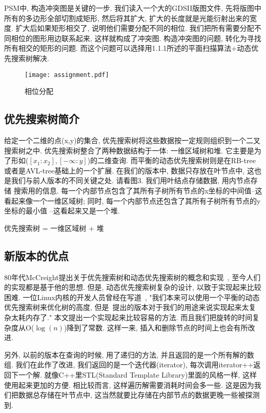\documentclass[a4paper]{article}
\begin{document}
    PSM中, 构造冲突图是关键的一步. 我们读入一个大的GDSII版图文件, 先将版图中所有的多边形全部切割成矩形, 然后将其扩大, 扩大的长度就是光能衍射出来的宽度. 扩大后如果矩形相交了, 说明他们需要分配不同的相位. 我们把所有需要分配不同相位的图形用边联系起来, 这样就构成了冲突图. 构造冲突图的问题, 转化为寻找所有相交的矩形的问题. 而这个问题可以选择用1.1.1所述的平面扫描算法+动态优先搜索树解决. 

\begin{figure}[!h]
  \centering
  \texttt{[image: assignment.pdf]}\\
  \caption{相位分配}\label{fig:assignment}
\end{figure}


\subsection{优先搜索树简介}
给定一个二维的点(x,y)的集合, 优先搜索树将这些数据按一定规则组织到一个二叉搜索树之中. 
优先搜索树整合了两种数据结构于一体: 一维区域树和堆. 
它主要是为了形如($[x_1:x_2],[-\infty:y]$)的二维查询. 而平衡的动态优先搜索树则是在RB-tree或者是AVL-tree基础上的一个扩展. 在我们的版本中, 数据只存放在叶节点中, 
这也是我们与前人版本的不同关键之处. 请看图3. 
我们用叶结点存储数据, 用内节点存储
搜索用的信息. 
每一个内部节点包含了其所有子树所有节点的x坐标的中间值--这看起来像一个一维区域树; 
同时, 每一个内部节点还包含了其所有子树所有节点的y坐标的最小值
--这看起来又是一个堆. 

优先搜索树 = 一维区域树 + 堆



\subsection{新版本的优点}
80年代McCreight提出关于优先搜索树和动态优先搜索树的概念和实现~\cite{Edward_04}, 至今人们的实现都是基于他的思想. 但是, 动态优先搜索树复杂的设计, 
以致于实现起来比较困难. 一位Linux内核的开发人员曾经在写道~\cite{LNX_03},
"我们本来可以使用一个平衡的动态优先搜索树来优化树的高度, 
但是~\cite{Edward_04}提出的版本对于我们的用途来说实现起来太复杂太耗内存了."
本文提出一个实现起来比较容易的方法. 
而且我们把旋转的时间复杂度从O($\log(n)$)降到了常数. 这样一来, 
插入和删除节点的时间上也会有所改进. 

另外, 以前的版本在查询的时候, 用了递归的方法, 并且返回的是一个所有解的数组. 
我们在此作了改进, 我们返回的是一个迭代器(iterator), 每次调用iterator++返回下一个解. 就像C++里STL(Standard Template
 Library)里面的风格一样, 
这样使用起来更加的方便. 相比较而言, 这样遍历解需要消耗时间会多一些. 
这是因为我们把数据总存储在叶节点中, 这当然就要比存储在内部节点的数据更晚一些被探测到. 
\end{document}
